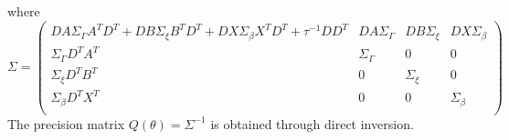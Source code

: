 \documentclass[num-refs,serif,10pt]{wiley-article}
\begin{document}
where
\begin{equation*}
\Sigma = \begin{pmatrix}
DA\Sigma_{\Gamma}A^{T}D^{T} + DB\Sigma_{\xi}B^{T}D^{T} + DX\Sigma_{\beta}X^{T}D^{T} + \tau^{-1}DD^{T} & DA\Sigma_{\Gamma} & DB\Sigma_{\xi} & DX\Sigma_{\beta} \\
\Sigma_{\Gamma}D^{T}A^{T} & \Sigma_{\Gamma} & 0 & 0 \\
\Sigma_{\xi}D^{T}B^{T} & 0 & \Sigma_{\xi} & 0 \\
\Sigma_{\beta}D^{T}X^{T} & 0 & 0 & \Sigma_{\beta} \\
\end{pmatrix}
\end{equation*}
The precision matrix $Q(\theta) = \Sigma^{-1}$ is obtained through direct inversion.


\nocite{*}%
%


\clearpage
\begin{table}[ht]
\centering
{}
\caption{Estimated means and standard deviations of linear effects by proposed method, Coxph and INLA, for Example \ref{subsec:kidney}.}
\label{table:KidneyFixed}
\end{table}
\end{document}
